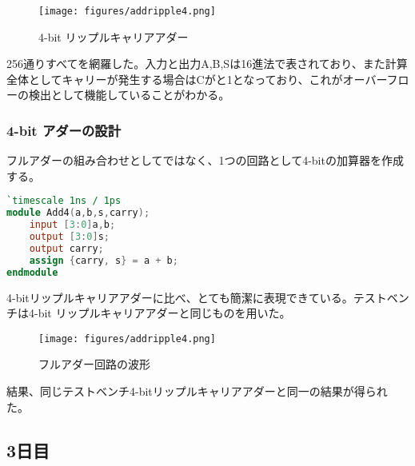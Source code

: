 \documentclass{ltjsarticle}
\begin{document}
\begin{figure}[H]
    \begin{center}
        \texttt{[image: figures/addripple4.png]}
        \caption{4-bit リップルキャリアアダー}
    \end{center}
\end{figure}
256通りすべてを網羅した。入力と出力A,B,Sは16進法で表されており、また計算全体としてキャリーが発生する場合はCがと1となっており、これがオーバーフローの検出として機能していることがわかる。
\subsubsection{4-bit アダーの設計}
フルアダーの組み合わせとしてではなく、1つの回路として4-bitの加算器を作成する。
\begin{lstlisting}[caption=4-bit アダー,language=verilog]
`timescale 1ns / 1ps
module Add4(a,b,s,carry); 
    input [3:0]a,b;
    output [3:0]s;
    output carry;
    assign {carry, s} = a + b;
endmodule    
\end{lstlisting}
4-bitリップルキャリアアダーに比べ、とても簡潔に表現できている。テストベンチは4-bit リップルキャリアアダーと同じものを用いた。
\begin{figure}[H]
    \begin{center}
        \texttt{[image: figures/addripple4.png]}
        \caption{フルアダー回路の波形}
    \end{center}
\end{figure}
結果、同じテストベンチ4-bitリップルキャリアアダーと同一の結果が得られた。
\subsection{3日目}
\end{document}
